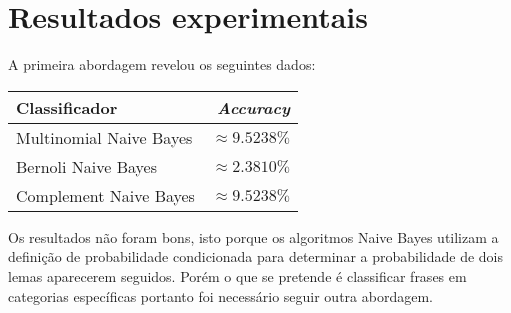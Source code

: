 \documentclass[12pt]{article}
\begin{document}
    \section*{Resultados experimentais}
    A primeira abordagem revelou os seguintes dados:
    \begin{center}
        \begin{tabular}{ l | r }
          \hline
          \textbf{Classificador} & \textbf{\textit{Accuracy}} \\ \hline
          Multinomial Naive Bayes & $\approx 9.5238\%$ \\ \hline
          Bernoli Naive Bayes & $\approx2.3810\%$ \\ \hline
          Complement Naive Bayes & $\approx 9.5238\%$ \\
          \hline
        \end{tabular}
      \end{center}

    Os resultados não foram bons, isto porque os algoritmos Naive Bayes utilizam a definição de
    probabilidade condicionada para determinar a probabilidade de dois lemas aparecerem seguidos.
    Porém o que se pretende é classificar frases em categorias específicas portanto foi necessário
    seguir outra abordagem. \newline
\end{document}
